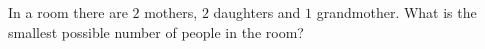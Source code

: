 In a room there are $2$ mothers, $2$ daughters and $1$ grandmother. What is the smallest possible number of people in the room?
